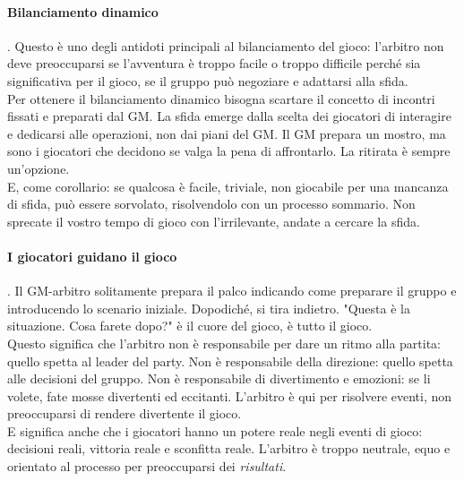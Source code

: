 \paragraph{Bilanciamento dinamico}. Questo è uno degli antidoti principali al bilanciamento del gioco: l'arbitro non deve preoccuparsi se l'avventura è troppo facile o troppo difficile perché sia significativa per il gioco, se il gruppo può negoziare e adattarsi alla sfida.\\
Per ottenere il bilanciamento dinamico bisogna scartare il concetto di incontri fissati e preparati dal GM. La sfida emerge dalla scelta dei giocatori di interagire e dedicarsi alle operazioni, non dai piani del GM. Il GM prepara un mostro, ma sono i giocatori che decidono se valga la pena di affrontarlo. La ritirata è sempre un'opzione.\\
E, come corollario: se qualcosa è facile, triviale, non giocabile per una mancanza di sfida, può essere sorvolato, risolvendolo con un processo sommario. Non sprecate il vostro tempo di gioco con l'irrilevante, andate a cercare la sfida.

\paragraph{I giocatori guidano il gioco}. Il GM-arbitro solitamente prepara il palco indicando come preparare il gruppo e introducendo lo scenario iniziale. Dopodiché, si tira indietro. "Questa è la situazione. Cosa farete dopo?" è il cuore del gioco, è tutto il gioco.\\
Questo significa che l'arbitro non è responsabile per dare un ritmo alla partita: quello spetta al leader del party. Non è responsabile della direzione: quello spetta alle decisioni del gruppo. Non è responsabile di divertimento e emozioni: se li volete, fate mosse divertenti ed eccitanti. L'arbitro è qui per risolvere eventi, non preoccuparsi di rendere divertente il gioco.\\
E significa anche che i giocatori hanno un potere reale negli eventi di gioco: decisioni reali, vittoria reale e sconfitta reale. L'arbitro è troppo neutrale, equo e orientato al processo per preoccuparsi dei \textit{risultati}.

